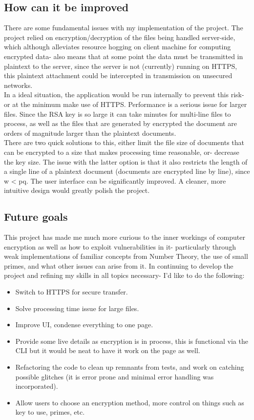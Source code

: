 \documentclass[a4paper]{article}
\begin{document}
\subsection{How can it be improved}
There are some fundamental issues with my implementation of the project. The project relied on encryption/decryption of the files being handled server-side, which although alleviates resource hogging on client machine for computing encrypted data- also means that at some point the data must be transmitted in plaintext to the server, since the server is not (currently) running on HTTPS, this plaintext attachment could be intercepted in transmission on unsecured networks. \\ In a ideal situation, the application would be run internally to prevent this risk- or at the minimum make use of HTTPS.
Performance is a serious issue for larger files. Since the RSA key is so large it can take minutes for multi-line files to process, as well as the files that are generated by encrypted the document are orders of magnitude larger than the plaintext documents. \\ 
There are two quick solutions to this, either limit the file size of documents that can be encrypted to a size that makes processing time reasonable, or- decrease the key size. The issue with the latter option is that it also restricts the length of a single line of a plaintext document (documents are encrypted line by line), since w < pq. 
The user interface can be significantly improved. A cleaner, more intuitive design would greatly polish the project.

\subsection{Future goals}
This project has made me much more curious to the inner workings of computer encryption as well as how to exploit vulnerabilities in it- particularly through weak implementations of familiar concepts from Number Theory, the use of small primes, and what other issues can arise from it. \newline
In continuing to develop the project and refining my skills in all topics necessary- I'd like to do the following:
\begin{itemize}
\item Switch to HTTPS for secure transfer.
\item Solve processing time issue for large files.
\item Improve UI, condense everything to one page.
\item Provide some live details as encryption is in process, this is functional via the CLI but it would be neat to have it work on the page as well.
\item Refactoring the code to clean up remnants from tests, and work on catching possible glitches (it is error prone and minimal error handling was incorporated).
\item Allow users to choose an encryption method, more control on things such as key to use, primes, etc.
\end{itemize}
\end{document}

